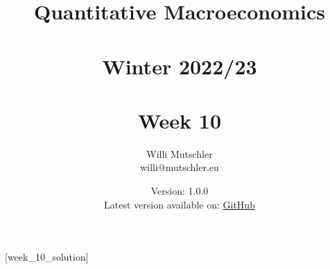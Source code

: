 
\newif\ifDisplaySolutions%


\title{Quantitative Macroeconomics\\~\\Winter 2022/23\\~\\Week 10}
\author{Willi Mutschler\\willi@mutschler.eu}
\date{Version: 1.0.0\\Latest version available on: \href{https://github.com/wmutschl/Quantitative-Macroeconomics/releases/latest/download/week_10.pdf}{GitHub}}
\maketitle\thispagestyle{empty}

\newpage
{}[week_10_solution]
\tableofcontents\thispagestyle{empty}\newpage

\setcounter{page}{1}
\newpage
\newpage

\printbibliography
\newpage

\ifDisplaySolutions
\newpage
\appendix
\section{Solutions}

\fi
